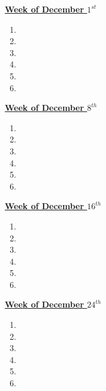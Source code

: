 \documentclass[11pt]{article}
\newcommand{\comments}[1]{}
\begin{document}
           {\small \underline{\textbf{Week of December $1^{st}$}}}\\
           \begin{enumerate}
             \small \item \small
           \item \small 
           \item \small
           \item \small 
           \item \small
           \item \small 
           \end{enumerate} 
           
           {\small \underline{\textbf{Week of December $8^{th}$}}}\\
           \begin{enumerate}
             \small \item \small
           \item \small 
           \item \small
           \item \small 
           \item \small
           \item \small 
           \end{enumerate}
           
           {\small \underline{\textbf{Week of December $16^{th}$}} }\\
           \begin{enumerate} 
             \small \item \small
           \item \small 
           \item \small
           \item \small 
           \item \small
           \item \small 
           \end{enumerate} 
\comments{
     {\small \underline{\textbf{Weekend of December $20^{th}$}} }\\
     \begin{enumerate} 
       \small \item \small 
     \item \small 
     \item \small
     \item \small 
     \item \small
      \item \small 
      \item \small   
     \end{enumerate}
     }
     {\small \underline{\textbf{Week of December $24^{th}$}} }\\
      \begin{enumerate}
        \small \item \small 
      \item \small
      \item \small 
      \item \small 
      \item \small 
      \item \small          
      \end{enumerate}
      \newpage
\end{document}
